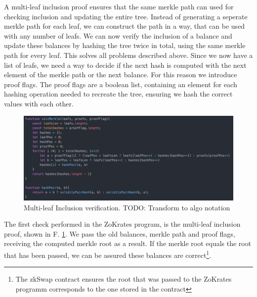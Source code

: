 \documentclass[../../thesis.tex]{subfiles}
\begin{document}
A multi-leaf inclusion proof ensures that the same merkle path can used for checking inclusion and updating the entire tree. Instead of generating a seperate merkle path for each leaf, we can construct the path in a way, that can be used with any number of leafs. We can now verify the inclusion of a balance and update these balances by hashing the tree twice in total, using the same merkle path for every leaf. This solves all problems described above. Since we now have a list of leafs, we need a way to decide if the next hash is computed with the next element of the merkle path or the next balance. For this reason we introduce proof flags. The proof flags are a boolean list, containing an element for each hashing operation needed to recreate the tree, ensuring we hash the correct values with each other. 

\begin{figure}[h]
    \centerline{\includegraphics[totalheight=5cm]{diagrams/multi-leaf.png}}
    \caption{Multi-leaf Inclusion verification. TODO: Transform to algo notation}
    \label{fig:multiLeaf}
\end{figure}

The first check performed in the ZoKrates program, is the multi-leaf inclusion proof, shown in F. \ref{fig:multiLeaf}. We pass the old balances, merkle path and proof flags, receiving the computed merkle root as a result. If the merkle root equals the root that has been passed, we can be assured these balances are correct\footnote{The zkSwap contract ensures the root that was passed to the ZoKrates programm corresponds to the one stored in the contract}.
\end{document}
